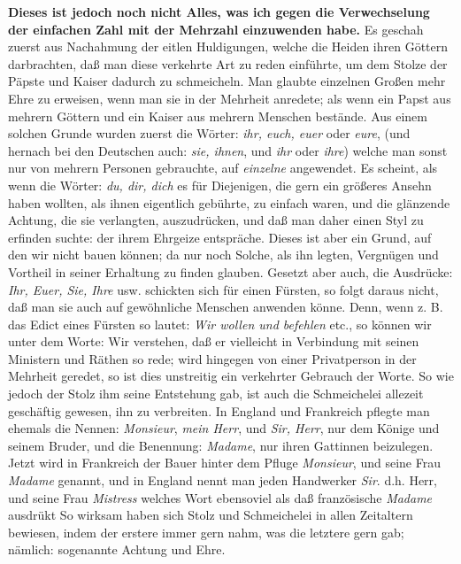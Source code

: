 \textbf{Dieses ist jedoch noch nicht Alles, was ich gegen die Verwechselung der
einfachen Zahl mit der Mehrzahl einzuwenden habe.} Es geschah zuerst aus
Nachahmung der eitlen Huldigungen, welche die Heiden ihren Göttern darbrachten,
daß man diese verkehrte Art zu reden einführte, um dem Stolze der Päpste und
Kaiser dadurch zu schmeicheln. Man glaubte einzelnen Großen mehr Ehre zu
erweisen, wenn man sie in der Mehrheit anredete; als wenn ein Papst aus mehrern
Göttern und ein Kaiser aus mehrern Menschen bestände. Aus einem solchen Grunde
wurden zuerst die Wörter: \textit{ihr, euch, euer} oder \textit{eure}, (und hernach bei
den Deutschen auch: \textit{sie, ihnen}, und \textit{ihr} oder \textit{ihre}) welche man sonst
nur von mehrern Personen gebrauchte, auf \textit{einzelne} angewendet. Es scheint,
als wenn die Wörter: \textit{du, dir, dich} es für Diejenigen, die gern ein größeres
Ansehn haben wollten, als ihnen eigentlich gebührte, zu einfach waren, und die
glänzende Achtung, die sie verlangten, auszudrücken, und daß man daher einen
Styl zu erfinden suchte: der ihrem Ehrgeize entspräche. Dieses ist aber ein
Grund, auf den wir nicht bauen können; da nur noch Solche, als ihn legten,
Vergnügen und Vortheil in seiner Erhaltung zu finden glauben. Gesetzt aber auch,
die Ausdrücke: \textit{Ihr, Euer, Sie, Ihre} usw. schickten sich für einen Fürsten,
so folgt daraus nicht, daß man sie auch auf gewöhnliche Menschen anwenden könne.
Denn, wenn z. B. das Edict eines Fürsten so lautet: \textit{Wir wollen und befehlen}
etc., so können wir unter dem Worte: Wir verstehen, daß er vielleicht in
Verbindung mit seinen Ministern und Räthen so rede; wird hingegen von einer
Privatperson in der Mehrheit geredet, so ist dies unstreitig ein verkehrter
Gebrauch der Worte. So wie jedoch der Stolz ihm seine Entstehung gab, ist auch
die Schmeichelei allezeit geschäftig gewesen, ihn zu verbreiten. In England und
Frankreich pflegte man ehemals die Nennen: \textit{Monsieur}, \textit{mein Herr}, und
\textit{Sir, Herr}, nur dem Könige und seinem Bruder, und die Benennung: \textit{Madame},
nur ihren Gattinnen beizulegen. Jetzt wird in Frankreich der Bauer hinter dem
Pfluge \textit{Monsieur}, und seine Frau \textit{Madame} genannt, und in England nennt man
jeden Handwerker \textit{Sir}. d.h. Herr, und seine Frau \textit{Mistress} welches Wort
ebensoviel als daß französische \textit{Madame} ausdrükt So wirksam haben sich Stolz und
Schmeichelei in allen Zeitaltern bewiesen, indem der erstere immer gern nahm,
was die letztere gern gab; nämlich: sogenannte Achtung und Ehre.

